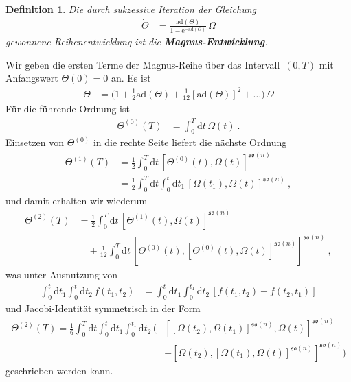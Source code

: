\documentclass[10pt,a4paper]{article}
\theoremstyle{mytheorem}
\theoremstyle{mydefinition}
\newtheorem{definition}[theorem]{Definition}
\newcommand{\mydef}[1]{\textbf{\textit{#1}}}
\newcommand{\dt}{\mathrm{d}}
\newcommand{\ad}{\mathrm{ad}}
\newcommand{\fso}{\mathfrak{so}}
\begin{document}
\begin{definition}
Die durch sukzessive Iteration der Gleichung
\begin{align*}
	\dot{\Theta}
	&= \frac{\ad(\Theta)}{1 - \mathrm{e}^{-\ad(\Theta)}}\,\Omega
\end{align*}
gewonnene Reihenentwicklung ist die \mydef{Magnus-Entwicklung}.
\end{definition}
Wir geben die ersten Terme der Magnus-Reihe über das Intervall~$(0, T)$ mit Anfangswert $\Theta(0)=0$ an.
Es ist 
\begin{align*}
	\dot{\Theta}
	&= 
	\Big(
		1 + \frac{1}{2}\ad(\Theta) 
		+ \frac{1}{12}[\ad(\Theta)]^2
		+ \ldots
	\Big)\,\Omega
\end{align*}
Für die führende Ordnung ist
\begin{align*}
	\Theta^{(0)}(T) &= \int_0^T\dt t\,\Omega(t)
	\ .
\end{align*}
Einsetzen von $\Theta^{(0)}$ in die rechte Seite liefert die nächste Ordnung
\begin{align*}
	\Theta^{(1)}(T)
	&=
	\frac{1}{2}\int_0^T\dt t\,
	[\Theta^{(0)}(t), \Omega(t)]^{\fso(n)}
	\nonumber\\	
	&=
	\frac{1}{2}\int_0^T\dt t\int_0^t\dt t_1 \,
	[\Omega(t_1), \Omega(t)]^{\fso(n)}
	\ ,
\end{align*}
und damit erhalten wir wiederum
\begin{align*}
\Theta^{(2)}(T)
	&= 
	\frac{1}{2}
	\int_0^T\dt t\, 
	[\Theta^{(1)}(t), \Omega(t)]^{\fso(n)}
	\nonumber\\
	&\quad
	+\frac{1}{12}
	\int_0^T\dt t\,
	[\Theta^{(0)}(t), [\Theta^{(0)}(t), \Omega(t)]^{\fso(n)}]^{\fso(n)}
	\ ,	
\end{align*}
was unter Ausnutzung von
\begin{align*}
	\int_0^t\dt t_1\int_0^t\dt t_2\, f(t_1,t_2)
	&=\int_0^t\dt t_1\int_0^{t_1}\dt t_2\,
	[f(t_1,t_2)-f(t_2,t_1)]
\end{align*}
und Jacobi-Identität symmetrisch in der Form
\begin{align*}
\Theta^{(2)}(T) 
	=
	\frac{1}{6}
	\int_0^T\dt t\int_0^t\dt t_1\int_0^{t_1}\dt t_2\,
	\Big(
		&[[\Omega(t_2), \Omega(t_1)]^{\fso(n)}, \Omega(t)]^{\fso(n)}
		\nonumber\\
		&
		+ [\Omega(t_2), [\Omega(t_1), \Omega(t)]^{\fso(n)}]^{\fso(n)}
	\Big)	
\end{align*}
geschrieben werden kann.
\end{document}
